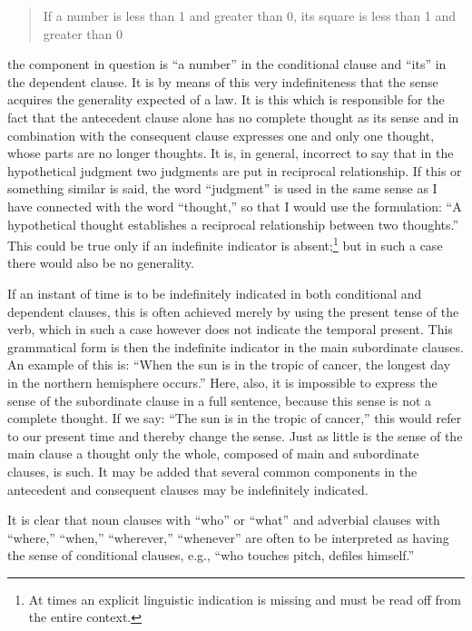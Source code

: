 \documentclass[twoside,12pt,a4paper]{article}
\begin{document}
\begin{quote}
  If a number is less than 1 and greater than 0, its square is less
  than 1 and greater than 0
\end{quote}

\noindent the component in question is ``a number'' in the conditional
clause and ``its'' in the dependent clause. It is by means of this
very indefiniteness that the sense acquires the generality expected of
a law. It is this which is responsible for the fact that the
antecedent clause alone has no complete thought as its sense and in
combination with the consequent clause expresses one and only one
thought, whose parts are no longer thoughts. It is, in general,
incorrect to say that in the hypothetical judgment two judgments are
put in reciprocal relationship. If this or something similar is said,
the word ``judgment'' is used in the same sense as I have connected
with the word ``thought,'' so that I would use the formulation: ``A
hypothetical thought establishes a reciprocal relationship between two
thoughts.'' This could be true only if an indefinite indicator is
absent;\footnote[11]{At times an explicit linguistic indication is
  missing and must be read off from the entire context.} but in such a
case there would also be no generality.

If an instant of time is to be indefinitely indicated in both
conditional and dependent clauses, this is often achieved merely by
using the present tense of the verb, which in such a case however does
not indicate the temporal present. This grammatical form is then the
indefinite indicator in the main subordinate clauses. An example of
this is: ``When the sun is in the tropic of cancer, the longest day
in the northern hemisphere occurs.'' Here, also, it is impossible to
express the sense of the subordinate clause in a full sentence,
because this sense is not a complete thought. If we say: ``The sun is
in the tropic of cancer,'' this would refer to our present time and
thereby change the sense. Just as little is the sense of the main
clause a thought only the whole, composed of main and subordinate
clauses, is such. It may be added that several common components in
the antecedent and consequent clauses may be indefinitely indicated.

It is clear that noun clauses with ``who'' or ``what'' and adverbial
clauses with ``where,'' ``when,'' ``wherever,'' ``whenever'' are often
to be interpreted as having the sense of conditional clauses, e.g.,
``who touches pitch, defiles himself.''
\end{document}

